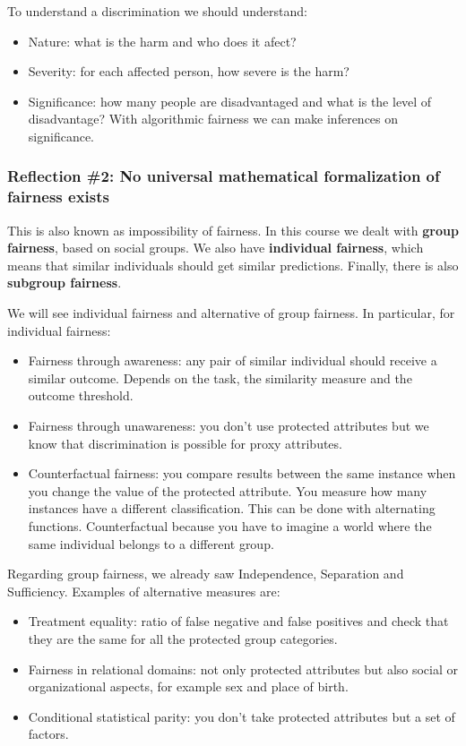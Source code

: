 To understand a discrimination we should understand:
\begin{itemize}
    \item Nature: what is the harm and who does it afect?
    \item Severity: for each affected person, how severe is the harm?
    \item Significance: how many people are disadvantaged and what is the level of disadvantage? With algorithmic fairness we can make inferences on significance.
\end{itemize}
\subsubsection{Reflection \#2: No universal mathematical formalization of fairness exists}
This is also known as impossibility of fairness. In this course we dealt with \textbf{group fairness}, based on social groups. We also have \textbf{individual fairness}, which means that similar individuals should get similar predictions. Finally, there is also \textbf{subgroup fairness}. 

We will see individual fairness and alternative of group fairness.
In particular, for individual fairness:
\begin{itemize}
    \item Fairness through awareness: any pair of similar individual should receive a similar outcome. Depends on the task, the similarity measure and the outcome threshold.
    \item Fairness through unawareness: you don't use protected attributes but we know that discrimination is possible for proxy attributes.
    \item Counterfactual fairness: you compare results between the same instance when you change the value of the protected attribute. You measure how many instances have a different classification. This can be done with alternating functions. Counterfactual because you have to imagine a world where the same individual belongs to a different group.
\end{itemize}
Regarding group fairness, we already saw Independence, Separation and Sufficiency. Examples of alternative measures are:
\begin{itemize}
    \item Treatment equality: ratio of false negative and false positives and check that they are the same for all the protected group categories.
    \item Fairness in relational domains: not only protected attributes but also social or organizational aspects, for example sex and place of birth. 
    \item Conditional statistical parity: you don't take protected attributes but a set of factors.
\end{itemize}
